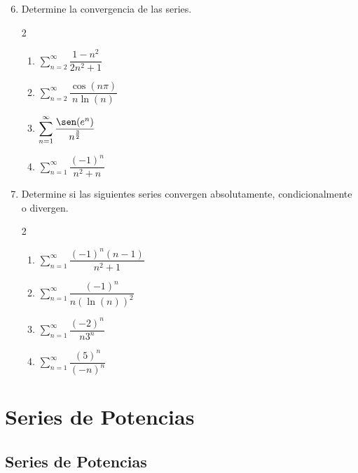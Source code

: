 \begin{frame}
  \begin{enumerate}
    \setcounter{enumi}{5}
    \item Determine la convergencia de las series.\\
    \begin{multicols}{2}
      \begin{enumerate}
        \item $\displaystyle\sum_{n=2}^\infty\dfrac{1-n^2}{2n^2+1}$
        \item $\displaystyle\sum_{n=2}^\infty\dfrac{\cos(n\pi)}{n\ln(n)}$
        \item $\displaystyle\sum_{n=1}^\infty\dfrac{\sen(e^n)}{n^{\frac{3}{2}}}$
        \item $\displaystyle\sum_{n=1}^\infty\dfrac{(-1)^n}{n^2+n}$
      \end{enumerate}
    \end{multicols}
    \item Determine si las siguientes series convergen absolutamente, condicionalmente o divergen.
      \begin{multicols}{2}
        \begin{enumerate}
          \item $\displaystyle\sum_{n=1}^\infty\dfrac{(-1)^n(n-1)}{n^2+1}$
          \item $\displaystyle\sum_{n=1}^\infty\dfrac{(-1)^n}{n(\ln(n))^2}$
          \item $\displaystyle\sum_{n=1}^\infty\dfrac{(-2)^n}{n3^n}$
          \item $\displaystyle\sum_{n=1}^\infty\dfrac{(5)^n}{(-n)^n}$
        \end{enumerate}
      \end{multicols}
  \end{enumerate}
\end{frame}

\section{Series de Potencias}
\begin{frame}
\sectionpage
\end{frame}

\begin{frame}
\tableofcontents[currentsection]
\end{frame}

\subsection{Series de Potencias}
\begin{frame}
\subsectionpage
\end{frame}

